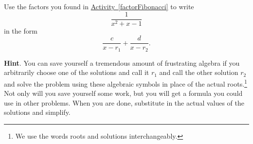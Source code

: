 \documentclass{book}
\begin{document}
\setcounter{cpjt}{268}
\addtocounter{cpjt}{-1}
\begin{activity}\label{fractionFibonacci}
\hypertarget{p-1367}{}%
Use the factors you found in \hyperref[factorFibonacci]{Activity~\ref{factorFibonacci}} to write%
\begin{equation*}
\frac{1}{x^2+x-1}
\end{equation*}
in the form%
\begin{equation*}
\frac{c}{x-r_1} + \frac{d}{x-r_2}.
\end{equation*}
%
\par\smallskip%
\noindent\textbf{Hint}.\hypertarget{hint-171}{}\quad%
\hypertarget{p-1368}{}%
You can save yourself a tremendous amount of frustrating algebra if you arbitrarily choose one of the solutions and call it \(r_1\) and call the other solution \(r_2\) and solve the problem using these algebraic symbols in place of the actual roots.\footnote{We use the words roots and solutions interchangeably.\label{fn-18}} Not only will you save yourself some work, but you will get a formula you could use in other problems. When you are done, substitute in the actual values of the solutions and simplify.%
\par\smallskip%
\noindent\end{activity}

\clearpage
\end{document}
